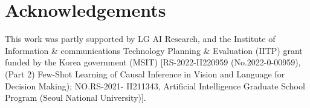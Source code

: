 

\section*{Acknowledgements}
\label{sec:acknowledgements}
This work was partly supported by LG AI Research, and the Institute of Information \& communications Technology Planning \& Evaluation (IITP) grant funded by the Korea government (MSIT) [RS-2022-II220959 (No.2022-0-00959), (Part 2) Few-Shot Learning of Causal Inference in Vision and Language for Decision Making); NO.RS-2021- II211343, Artificial Intelligence Graduate School Program (Seoul National University)].